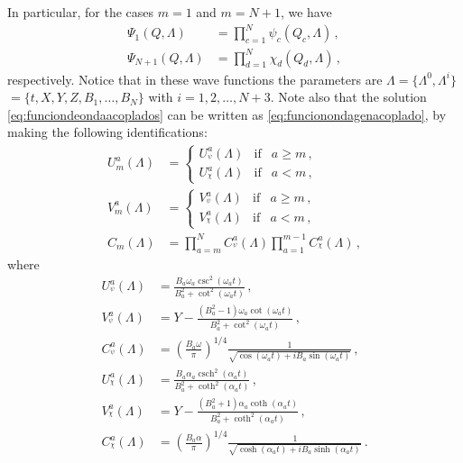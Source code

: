 \documentclass[12pt]{iopart}
\begin{document}
In particular, for the cases $m=1$ and $m=N+1$, we have
\begin{subequations}
\begin{align}
\Psi_{1}(Q,\Lambda)&= \prod_{c=1}^{N}\psi_c(Q_c,\Lambda) \,,\label{solm1}\\
\Psi_{N+1}(Q,\Lambda)&= \prod_{d=1}^{N}\chi_d(Q_d,\Lambda) \,, \label{solNplus1}
\end{align}
\end{subequations}
respectively. Notice that in these wave functions the parameters are $\Lambda= \{\Lambda^0,\Lambda^i\}$ \break $=\{t, X,Y,Z, B_1, \dots , B_N\}$ with $i=1,2,\dots, N+3$. Note also that the solution \eqref{eq:funciondeondaacoplados} can be written as \eqref{eq:funcionondagenacoplado}, by making the following identifications:
\begin{subequations}
    \begin{align}
    U^a_{m}(\Lambda)&= \left\{ \begin{array}{lcc}  U^{a}_{{}^\psi} \left(\Lambda\right) & \mathrm{if} &  a \geq m \,, \\ 
     U_{{}^\chi}^a(\Lambda) & \mathrm{if} & a< m \,,  \end{array} \right. \label{Uar}\\
    V^a_{m}(\Lambda)&= \left\{ \begin{array}{lcc} V_{{}^\psi}^a(\Lambda) & \mathrm{if} & a \geq m  \,, \\ V_{{}^\chi}^a(\Lambda) & \mathrm{if} & a< m \,,\end{array} \right. \\
    C_{m}(\Lambda)&=\prod_{a=m}^{N}C_{{}^\psi}^a(\Lambda) \prod_{a=1}^{m-1}C^a_{{}^\chi}(\Lambda)\,,
    \end{align}
\end{subequations}
where
\begin{subequations}
\begin{align}
    U_{{}^\psi}^a(\Lambda)&=\frac{B_a \omega_a \csc ^2\left( \omega_a t \right)}{B_a^2+\cot ^2\left( \omega_a t \right)}\,,\\
    V^a_{{}^\psi}(\Lambda)&=Y-\frac{\left(B_a^2-1\right) \omega_a \cot \left( \omega_a t \right)}{ B_a^2+\cot^2 \left( \omega_a t \right)}\, ,\\
    C_{{}^\psi}^a(\Lambda)&=\left( \frac{B_a \omega}{\pi} \right)^{1/4} \frac{1}{\sqrt{\cos \left( \omega_a t\right)+i B_a \sin \left( \omega_a t\right)}}\,, \\
    U_{{}^\chi}^a(\Lambda)&=\frac{ B_a \alpha_a \operatorname{csch}^2(\alpha_a  t)}{B_a^2+\coth ^2(\alpha_a  t)}\,,\\
    V_{{}^\chi}^a(\Lambda)&=Y-\frac{ \left(B_a^2+1\right) \alpha_a  \coth (\alpha_a  t)}{B_a^2+\coth ^2(\alpha_a  t)}\,,\\
    C^a_{{}^\chi}(\Lambda)&=\left( \frac{B_a \alpha}{\pi} \right)^{1/4} \frac{1}{\sqrt{\cosh \left( \alpha_a t\right)+i
   B_a \sinh \left( \alpha_a t\right)}}\,.
\end{align}
\end{subequations}
\end{document}

